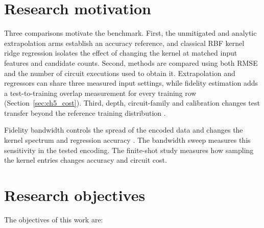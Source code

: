 \documentclass[Thesis.tex]{subfiles}
\begin{document}
\section{Research motivation}

Three comparisons motivate the benchmark. First, the unmitigated and analytic
extrapolation arms establish an accuracy reference, and classical RBF kernel
ridge regression isolates the effect of changing the kernel at matched input
features and candidate counts. Second, methods are compared using both RMSE and
the number of circuit executions used to obtain it. Extrapolation and regressors
can share three measured input settings, while fidelity estimation adds a
test-to-training overlap measurement for every training row
(Section~\ref{sec:ch5_cost}). Third, depth, circuit-family and calibration changes
test transfer beyond the reference training distribution
\cite{caro2022generalization,caro2023ood}.

Fidelity bandwidth controls the spread of the encoded data and changes the
kernel spectrum and regression accuracy
\cite{shaydulin2022importance,canatar2023bandwidth,thanasilp2024exponential}.
The bandwidth sweep measures this sensitivity in the tested encoding. The finite-shot study measures how sampling the kernel entries changes accuracy
and circuit cost.

\section{Research objectives}

The objectives of this work are:
\end{document}
